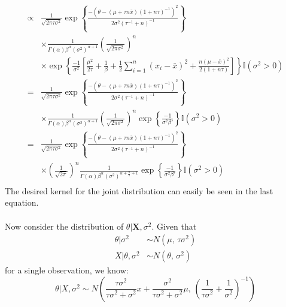 \documentclass[11pt]{article}
\begin{document}
\begin{align*}
      \propto &
        \frac{1}{\sqrt{2\pi\tau\sigma^2}}
          \exp\left\{
            \frac{-\left(\theta - (\mu+\tau n \bar{x})(1+n\tau)^{-1}\right)^2}{2\sigma^2(\tau^{-1}+n)^{-1}}
          \right\} \\
      & \times
        \frac{1}{\Gamma(\alpha) \beta^\alpha (\sigma^2)^{\alpha+1}}
        \left( \frac{1}{\sqrt{2\pi\sigma^2}} \right)^n \\
      & \times
        \exp \left\{
          \frac{-1}{\sigma^2}
          \left[
            \frac{\mu^2}{2\tau} + \frac{1}{\beta}
            + \frac{1}{2}\sum_{i=1}^n\left( x_i - \bar{x} \right)^2
            + \frac{n(\mu-\bar{x})^2}{2(1+n\tau)}
          \right]
        \right\}
        \mathbb{I}(\sigma^2>0) \\
      = &  
        \frac{1}{\sqrt{2\pi\tau\sigma^2}}
          \exp\left\{
            \frac{-\left(\theta - (\mu+\tau n \bar{x})(1+n\tau)^{-1}\right)^2}{2\sigma^2(\tau^{-1}+n)^{-1}}
          \right\} \\
      & \times
        \frac{1}{\Gamma(\alpha) \beta^\alpha (\sigma^2)^{\alpha+1}}
        \left( \frac{1}{\sqrt{2\pi\sigma^2}} \right)^n
        \exp \left\{
          \frac{-1}{\sigma^2 \beta'}
        \right\}
        \mathbb{I}(\sigma^2>0) \\
      = &  
        \frac{1}{\sqrt{2\pi\tau\sigma^2}}
          \exp\left\{
            \frac{-\left(\theta - (\mu+\tau n \bar{x})(1+n\tau)^{-1}\right)^2}{2\sigma^2(\tau^{-1}+n)^{-1}}
          \right\} \\
      & \times
        \left( \frac{1}{\sqrt{2\pi}} \right)^n
        \frac{1}{\Gamma(\alpha) \beta^\alpha (\sigma^2)^{\alpha+\frac{n}{2}+1}}
        \exp \left\{
          \frac{-1}{\sigma^2 \beta'}
        \right\}
        \mathbb{I}(\sigma^2>0) \\
  \end{align*}
The desired kernel for the joint distribution can easily be seen in the last equation.
\\ \\
Now consider the distribution of $\theta | \mathbf{X}, \sigma^2$.  Given that
\begin{align*}
  \theta | \sigma^2 & \sim N(\mu, \, \tau\sigma^2) \\
  X | \theta, \sigma^2 & \sim N(\theta, \, \sigma^2)
\end{align*}
for a single observation, we know:
\[ \theta | X, \sigma^2 \sim 
  N\left(
    \frac{\tau\sigma^2}{\tau\sigma^2 + \sigma^2}x + \frac{\sigma^2}{\tau\sigma^2 + \sigma^2}\mu, \,
    \left( \frac{1}{\tau\sigma^2} + \frac{1}{\sigma^2}\right)^{-1}
  \right) 
\]
\end{document}
